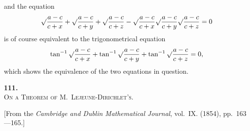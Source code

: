 \documentclass[11pt]{article}
\begin{document}
and the equation
\[
\surd\frac{a-c}{c+x} + \surd\frac{a-c}{c+y} + \surd\frac{a-c}{c+z}
- \surd\frac{a-c}{c+x}\surd\frac{a-c}{c+y}\surd\frac{a-c}{c+z} = 0
\]
is of course equivalent to the trigonometrical equation
\[
\tan^{-1}\surd\frac{a-c}{c+x} + \tan^{-1}\surd\frac{a-c}{c+y} + \tan^{-1}\surd\frac{a-c}{c+z} = 0,
\]
which shows the equivalence of the two equations in question.


\newpage
\setcounter{page}{47}

\begin{center}
{\Large\bfseries 111.}\\[0.5em]
{\large\scshape On a Theorem of M.~Lejeune-Dirichlet's.}
\end{center}
\vspace{0.3em}
\begin{center}
\small [From the \textit{Cambridge and Dublin Mathematical Journal}, vol.~IX. (1854), pp.~163---165.]
\end{center}
\vspace{0.5em}
\end{document}
